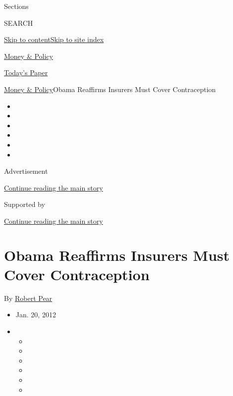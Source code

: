Sections

SEARCH

\protect\hyperlink{site-content}{Skip to
content}\protect\hyperlink{site-index}{Skip to site index}

\href{https://www.nytimes3xbfgragh.onion/section/health/policy}{Money \&
Policy}

\href{https://myaccount.nytimes3xbfgragh.onion/auth/login?response_type=cookie\&client_id=vi}{}

\href{https://www.nytimes3xbfgragh.onion/section/todayspaper}{Today's
Paper}

\href{/section/health/policy}{Money \& Policy}\textbar{}Obama Reaffirms
Insurers Must Cover Contraception

\begin{itemize}
\item
\item
\item
\item
\item
\item
\end{itemize}

Advertisement

\protect\hyperlink{after-top}{Continue reading the main story}

Supported by

\protect\hyperlink{after-sponsor}{Continue reading the main story}

\hypertarget{obama-reaffirms-insurers-must-cover-contraception}{%
\section{Obama Reaffirms Insurers Must Cover
Contraception}\label{obama-reaffirms-insurers-must-cover-contraception}}

By \href{https://www.nytimes3xbfgragh.onion/by/robert-pear}{Robert Pear}

\begin{itemize}
\item
  Jan. 20, 2012
\item
  \begin{itemize}
  \item
  \item
  \item
  \item
  \item
  \item
  \end{itemize}
\end{itemize}

